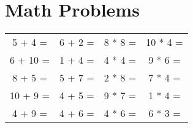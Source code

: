 \documentclass{article}%
\begin{document}
%
\normalsize%
\section{Math Problems}%
\label{sec:MathProblems}%
\Large%
\begin{tabular}{c|c|c|c}%
5 + 4 = &6 + 2 = &8 * 8 = &10 * 4 = \\%
6 + 10 = &1 + 4 = &4 * 4 = &9 * 6 = \\%
8 + 5 = &5 + 7 = &2 * 8 = &7 * 4 = \\%
10 + 9 = &4 + 5 = &9 * 7 = &1 * 4 = \\%
4 + 9 = &4 + 6 = &4 * 6 = &6 * 3 = \\%
\end{tabular}

%
\end{document}
